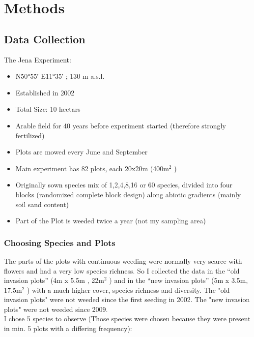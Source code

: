\label{ch:methods}

\section{Methods}

\subsection{Data Collection}

The Jena Experiment:

\begin{itemize}
\item N\ang{50;55;} E\ang{11;35;} ; 130 m a.s.l.
\item	Established in 2002
\item	Total Size: 10 hectars
\item	Arable field for 40 years before experiment started (therefore strongly fertilized)
\item	Plots are mowed every June and September
\item	Main experiment has 82 plots, each 20x20m (400m$^2$ )
\item	Originally sown species mix of 1,2,4,8,16 or 60 species, divided into four blocks (randomized complete block design) along abiotic gradients (mainly soil sand content)
\item	Part of the Plot is weeded twice a year (not my sampling area)
\end{itemize}


\subsubsection{Choosing Species and Plots}

The parts of the plots with continuous weeding were normally very scarce with flowers and had a very low species richness. So I collected the data in the “old invasion plots” (4m x 5.5m , 22m$^2$ ) and in the “new invasion plots” (5m x 3.5m, 17.5m$^2$ ) with a much higher cover, species richness and diversity. The "old invasion plots" were not weeded since the first seeding in 2002. The "new invasion plots" were not weeded since 2009.\\

I chose 5 species to observe (Those species were chosen because they were present in min. 5 plots with a differing frequency):

